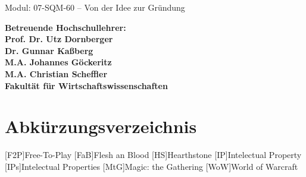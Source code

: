 \documentclass[fontsize=11, a4aper]{scrartcl}
\begin{document}

Modul: 07-SQM-60 -- Von der Idee zur Gründung

\begin{flushleft}
	
	\textbf{Betreuende Hochschullehrer:\\
			\hspace{1mm} Prof. Dr. Utz Dornberger\\
			\hspace{1mm} Dr. Gunnar Kaßberg\\
			\hspace{1mm} M.A. Johannes Göckeritz\\
			\hspace{1mm} M.A. Christian Scheffler}\\
	\textbf{Fakultät für Wirtschaftswissenschaften}\\
	
\end{flushleft}


\newpage




\tableofcontents


\newpage



\section*{Abkürzungsverzeichnis}


\begin{acronym}
	[F2P]{Free-To-Play}
	[FaB]{Flesh an Blood}
	[HS]{Hearthstone}
	[IP]{Intelectual Property}
	[IPs]{Intelectual Properties}
	[MtG]{Magic: the Gathering}
	[WoW]{World of Warcraft}
\end{acronym}

\newpage

\end{document}
